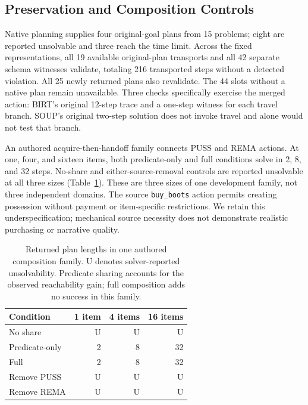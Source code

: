 \subsection{Preservation and Composition Controls}
Native planning supplies four original-goal plans from 15 problems; eight are reported unsolvable and three reach the time limit. Across the fixed representations, all 19 available original-plan transports and all 42 separate schema witnesses validate, totaling 216 transported steps without a detected violation. All 25 newly returned plans also revalidate. The 44 slots without a native plan remain unavailable. Three checks specifically exercise the merged action: BIRT's original 12-step trace and a one-step witness for each travel branch. SOUP's original two-step solution does not invoke travel and alone would not test that branch.

An authored acquire-then-handoff family connects PUSS and REMA actions. At one, four, and sixteen items, both predicate-only and full conditions solve in 2, 8, and 32 steps. No-share and either-source-removal controls are reported unsolvable at all three sizes (Table~\ref{tab:handoff}). These are three sizes of one development family, not three independent domains. The source \texttt{buy\_boots} action permits creating possession without payment or item-specific restrictions. We retain this underspecification; mechanical source necessity does not demonstrate realistic purchasing or narrative quality.

\begin{table}[t]
\centering
\begin{tabular}{lrrr}
\toprule
Condition & 1 item & 4 items & 16 items\\
\midrule
No share & U & U & U\\
Predicate-only & 2 & 8 & 32\\
Full & 2 & 8 & 32\\
Remove PUSS & U & U & U\\
Remove REMA & U & U & U\\
\bottomrule
\end{tabular}
\caption{Returned plan lengths in one authored composition family. U denotes solver-reported unsolvability. Predicate sharing accounts for the observed reachability gain; full composition adds no success in this family.}
\label{tab:handoff}
\end{table}

